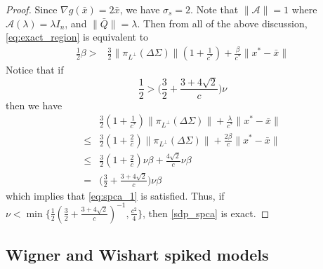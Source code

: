 \documentclass[11pt]{amsart}
\theoremstyle{plain}
\newtheorem{cor}{Corollary}[section]
\theoremstyle{definition}
\theoremstyle{remark}
\newcommand{\cA}{{\mathcal{A}}}
\newcommand{\RR}{\mathbb{R}}
\begin{document}
\begin{proof}
		Since $\nabla g(\bar x) = 2\bar x$, we have $\sigma_s = 2$. Note that $\|\cA\| = 1$ where \(\cA(\lambda) = \lambda I_n\), and \(\|\bar Q\| = \lambda\). Then from all of the above discussion,  \eqref{eq:exact_region} is equivalent to
		\begin{equation}\label{eq:spca_1}
			\begin{split}
				\tfrac{1}{2}\beta >&\tfrac{3}{2}\|\pi_{L^\perp}(\Delta\Sigma)\| (1+\tfrac{1}{c^*}) + \tfrac{\beta}{c^*}\|x^*-\bar x\|
			\end{split}        
		\end{equation}
		Notice that if 
		\[
		\frac{1}{2}>\Big(\frac{3}{2} + \frac{3 + 4\sqrt{2}}{c}\Big)\nu
		\]
		then we have
		\begin{equation}\label{eq:spca_2}
			\begin{split}
				&\frac{3}{2}(1+\frac{1}{c^*}) \|\pi_{L^\perp}(\Delta\Sigma)\|+ \frac{\lambda}{c^*}\|x^*-\bar x\|\\
				\leq &  \frac{3}{2}(1 + \frac{2}{c})\|\pi_{L^\perp}(\Delta\Sigma)\|+ \frac{2\beta}{c}\|x^*-\bar x\|\\
				\leq & \frac{3}{2}(1 + \frac{2}{c})\nu\beta +  \frac{4\sqrt{2}}{c}\nu\beta \\
				= &\Big(\frac{3}{2} + \frac{3 + 4\sqrt{2}}{c}\Big)\nu\beta
			\end{split}
		\end{equation}
		which implies that \eqref{eq:spca_1} is satisfied. Thus, if \(\nu < \min\big\{ \tfrac{1}{2}(\frac{3}{2} + \frac{3 + 4\sqrt{2}}{c})^{-1},\tfrac{c^2}{4}\big\}\),
		then \eqref{sdp_spca} is exact.\qedhere
		
	\end{proof}
	
	
	
	\subsection{Wigner and Wishart spiked models}\label{subsection:spiked_model}
	
\end{document}

